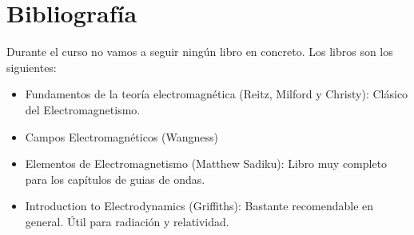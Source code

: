 \documentclass[{../apuntes.tex}]{subfiles}
\begin{document}
\section*{Bibliografía}

Durante el curso no vamos a seguir ningún libro en concreto. Los libros son los siguientes:


\begin{itemize}
	\item Fundamentos de la teoría electromagnética (Reitz, Milford y Christy): Clásico del Electromagnetismo.
	\item Campos Electromagnéticos (Wangness)
	\item Elementos de Electromagnetismo (Matthew Sadiku): Libro muy completo para los capítulos de guias de ondas.
	\item Introduction to Electrodynamics (Griffiths): Bastante recomendable en general. Útil para radiación y relatividad.

\end{itemize}
\end{document}

